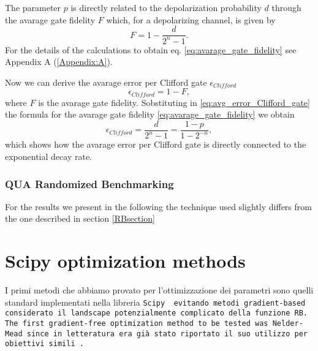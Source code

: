 \begin{comment}
    The exponential form arises from modeling each gate application as an independent error process. When you compose multiple noisy gates, their error contributions multiply, leading naturally to an exponential decay.
\end{comment}    

The parameter $p$ is directly related to the depolarization probability $d$ through the avarage gate fidelity $F$ which, for a depolarizing channel, is given by \begin{equation}
    F = 1 - \frac{d}{2^n - 1}\label{eq:avarage_gate_fidelity}.
\end{equation}
For the details of the calculations to obtain eq. \ref{eq:avarage_gate_fidelity} see Appendix A (\ref{Appendix:A}).

Now we can derive the avarage error per Clifford gate $\epsilon_{Clifford}$ \begin{equation}
    \epsilon_{Clifford} = 1 - F \label{eq:avg_error_Clifford_gate},
\end{equation}
where $F$ is the avarage gate fidelity. Sobstituting in \ref{eq:avg_error_Clifford_gate} the formula for the avarage gate fidelity \ref{eq:avarage_gate_fidelity} we obtain \begin{equation}
    \epsilon_{Clifford} = \frac{d}{2^n -1} = \frac{1-p}{1-2^{-n}},
\end{equation}
which shows how the avarage error per Clifford gate is directly connected to the exponential decay rate.

\subsubsection{QUA Randomized Benchmarking}
For the results we present in the following the technique used slightly differs from the one described in section \ref{RBsection} 

\section{Scipy optimization methods}\label{Sec:OptimizationMethods}
I primi metodi che abbiamo provato per l'ottimizzazione dei parametri sono quelli standard implementati nella libreria \tt{Scipy} \cite{SciPy-NMeth} evitando metodi gradient-based considerato il landscape potenzialmente complicato della funzione RB.
The first gradient-free optimization method to be tested was Nelder-Mead since in letteratura era già stato riportato il suo utilizzo per obiettivi simili \cite{kelly_optimal_2014}.

